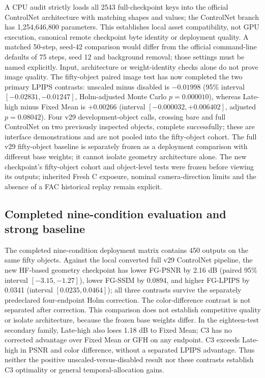\documentclass[11pt]{article}
\begin{document}
A CPU audit strictly loads all 2543 full-checkpoint keys into the official ControlNet architecture with matching shapes and values; the ControlNet branch has 1,254,646,800 parameters. This establishes local asset compatibility, not GPU execution, canonical remote checkpoint byte identity or deployment quality. A matched 50-step, seed-42 comparison would differ from the official command-line defaults of 75 steps, seed 12 and background removal; those settings must be named explicitly. Input, architecture or weight-identity checks alone do not prove image quality. The fifty-object paired image test has now completed the two primary LPIPS contrasts: unscaled minus disabled is $-0.01998$ (95\% interval $[-0.02831,-0.01247]$, Holm-adjusted Monte Carlo $p=0.000010$), whereas Late-high minus Fixed Mean is $+0.00266$ (interval $[-0.000032,+0.006402]$, adjusted $p=0.08042$). Four v29 development-object calls, crossing bare and full ControlNet on two previously inspected objects, complete successfully; these are interface demonstrations and are not pooled into the fifty-object cohort. The full v29 fifty-object baseline is separately frozen as a deployment comparison with different base weights; it cannot isolate geometry architecture alone. The new checkpoint's fifty-object cohort and object-level tests were frozen before viewing its outputs; inherited Fresh C exposure, nominal camera-direction limits and the absence of a FAC historical replay remain explicit.

\subsection*{Completed nine-condition evaluation and strong baseline}
The completed nine-condition deployment matrix contains 450 outputs on the same fifty objects. Against the local converted full v29 ControlNet pipeline, the new HF-based geometry checkpoint has lower FG-PSNR by 2.16 dB (paired 95\% interval $[-3.15,-1.27]$), lower FG-SSIM by 0.0894, and higher FG-LPIPS by 0.0341 (interval $[0.0235,0.0464]$); all three contrasts survive the separately predeclared four-endpoint Holm correction. The color-difference contrast is not separated after correction. This comparison does not establish competitive quality or isolate architecture, because the frozen base weights differ. In the eighteen-test secondary family, Late-high also loses 1.18 dB to Fixed Mean; C3 has no corrected advantage over Fixed Mean or GFH on any endpoint. C3 exceeds Late-high in PSNR and color difference, without a separated LPIPS advantage. Thus neither the positive unscaled-versus-disabled result nor these contrasts establish C3 optimality or general temporal-allocation gains.
\end{document}
